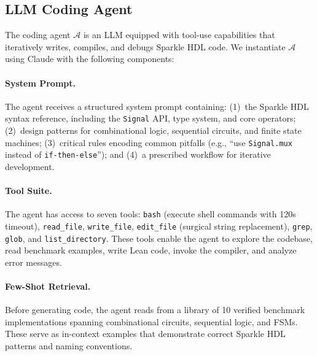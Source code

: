 \subsection{LLM Coding Agent}
\label{sec:agent}

The coding agent $\mathcal{A}$ is an LLM equipped with tool-use capabilities that iteratively writes, compiles, and debugs Sparkle HDL code. We instantiate $\mathcal{A}$ using Claude with the following components:

\paragraph{System Prompt.}
The agent receives a structured system prompt containing: (1)~the Sparkle HDL syntax reference, including the \texttt{Signal} API, type system, and core operators; (2)~design patterns for combinational logic, sequential circuits, and finite state machines; (3)~critical rules encoding common pitfalls (e.g., ``use \texttt{Signal.mux} instead of \texttt{if-then-else}''); and (4)~a prescribed workflow for iterative development.

\paragraph{Tool Suite.}
The agent has access to seven tools: \texttt{bash} (execute shell commands with 120s timeout), \texttt{read\_file}, \texttt{write\_file}, \texttt{edit\_file} (surgical string replacement), \texttt{grep}, \texttt{glob}, and \texttt{list\_directory}. These tools enable the agent to explore the codebase, read benchmark examples, write Lean code, invoke the compiler, and analyze error messages.

\paragraph{Few-Shot Retrieval.}
Before generating code, the agent reads from a library of 10 verified benchmark implementations spanning combinational circuits, sequential logic, and FSMs. These serve as in-context examples that demonstrate correct Sparkle HDL patterns and naming conventions.

